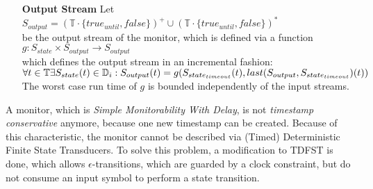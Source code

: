 \begin{definition}
\begin{itemize}
			\item[\textbf{Output Stream}]
				Let $S_{output}= (\mathbb{T}\cdot \{true_{until}, false\})^+\cup(\mathbb{T}\cdot \{true_{until}, false\})^*$\\
				be the output stream of the monitor, which is defined via a function\\
				$g:S_{state}\times S_{output}\rightarrow S_{output}$\\
				which defines the output stream in an incremental fashion:\\
				\begin{math}
					\forall t\in \mathbb T \exists S_{state}(t)\in\mathbb D_i:\\
					S_{output}(t)= g(S_{state_{timeout}}(t), last(S_{output}, S_{state_{timeout}})(t))
				\end{math} \\
				The worst case run time of $g$ is bounded independently of the input streams.
		\end{itemize}
	\end{definition}
		A monitor, which is \textit{Simple Monitorability With Delay}, is not \textit{timestamp conservative} anymore, because one new timestamp can be created. Because of this characteristic, the monitor cannot be described via (Timed) Deterministic Finite State Transducers. To solve this problem, a modification to TDFST is done, which allows $\epsilon$-transitions, which are guarded by a clock constraint, but do not consume an input symbol to perform a state transition.
